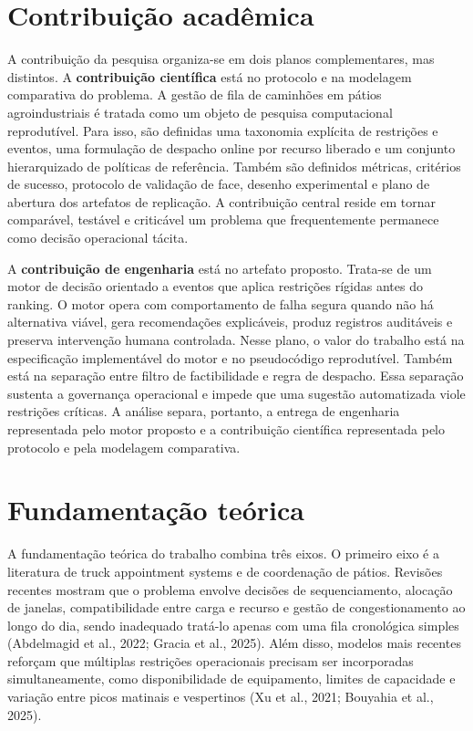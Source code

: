 \documentclass[
  12pt,
  oneside,
  a4paper,
  sumario=tradicional,
  brazil
]{abntex2}
\begin{document}
\chapter{Contribuição acadêmica}
A contribui\c{c}\~ao da pesquisa organiza-se em dois planos complementares, mas distintos. A \textbf{contribui\c{c}\~ao cient\'ifica} est\'a no protocolo e na modelagem comparativa do problema. A gest\~ao de fila de caminh\~oes em p\'atios agroindustriais \'e tratada como um objeto de pesquisa computacional reprodut\'ivel. Para isso, s\~ao definidas uma taxonomia expl\'icita de restri\c{c}\~oes e eventos, uma formula\c{c}\~ao de despacho online por recurso liberado e um conjunto hierarquizado de pol\'iticas de refer\^encia. Tamb\'em s\~ao definidos m\'etricas, crit\'erios de sucesso, protocolo de valida\c{c}\~ao de face, desenho experimental e plano de abertura dos artefatos de replica\c{c}\~ao. A contribui\c{c}\~ao central reside em tornar compar\'avel, test\'avel e critic\'avel um problema que frequentemente permanece como decis\~ao operacional t\'acita.

A \textbf{contribui\c{c}\~ao de engenharia} est\'a no artefato proposto. Trata-se de um motor de decis\~ao orientado a eventos que aplica restri\c{c}\~oes r\'igidas antes do ranking. O motor opera com comportamento de falha segura quando n\~ao h\'a alternativa vi\'avel, gera recomenda\c{c}\~oes explic\'aveis, produz registros audit\'aveis e preserva interven\c{c}\~ao humana controlada. Nesse plano, o valor do trabalho est\'a na especifica\c{c}\~ao implement\'avel do motor e no pseudoc\'odigo reprodut\'ivel. Tamb\'em est\'a na separa\c{c}\~ao entre filtro de factibilidade e regra de despacho. Essa separa\c{c}\~ao sustenta a governan\c{c}a operacional e impede que uma sugest\~ao automatizada viole restri\c{c}\~oes cr\'iticas. A an\'alise separa, portanto, a entrega de engenharia representada pelo motor proposto e a contribui\c{c}\~ao cient\'ifica representada pelo protocolo e pela modelagem comparativa.

\chapter{Fundamentação teórica}
A fundamenta\c{c}\~ao te\'orica do trabalho combina tr\^es eixos. O primeiro eixo \'e a literatura de truck appointment systems e de coordena\c{c}\~ao de p\'atios. Revis\~oes recentes mostram que o problema envolve decis\~oes de sequenciamento, aloca\c{c}\~ao de janelas, compatibilidade entre carga e recurso e gest\~ao de congestionamento ao longo do dia, sendo inadequado trat\'a-lo apenas com uma fila cronol\'ogica simples (Abdelmagid et al., 2022; Gracia et al., 2025). Al\'em disso, modelos mais recentes refor\c{c}am que m\'ultiplas restri\c{c}\~oes operacionais precisam ser incorporadas simultaneamente, como disponibilidade de equipamento, limites de capacidade e varia\c{c}\~ao entre picos matinais e vespertinos (Xu et al., 2021; Bouyahia et al., 2025).
\end{document}
